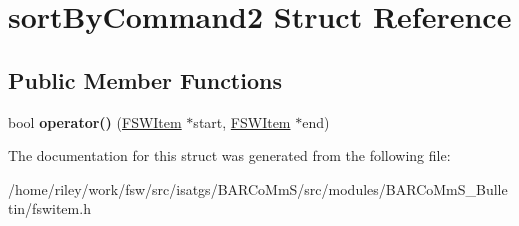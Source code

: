 \hypertarget{structsort_by_command2}{}\section{sort\+By\+Command2 Struct Reference}
\label{structsort_by_command2}
\subsection*{Public Member Functions}
\begin{DoxyCompactItemize}
\item 
bool {\bfseries operator()} (\hyperlink{class_f_s_w_item}{F\+S\+W\+Item} $\ast$start, \hyperlink{class_f_s_w_item}{F\+S\+W\+Item} $\ast$end)\hypertarget{structsort_by_command2_af15ad4b3511161b525f8efdd33f07b3f}{}\label{structsort_by_command2_af15ad4b3511161b525f8efdd33f07b3f}

\end{DoxyCompactItemize}


The documentation for this struct was generated from the following file\+:\begin{DoxyCompactItemize}
\item 
/home/riley/work/fsw/src/isatgs/\+B\+A\+R\+Co\+Mm\+S/src/modules/\+B\+A\+R\+Co\+Mm\+S\+\_\+\+Bulletin/fswitem.\+h\end{DoxyCompactItemize}

